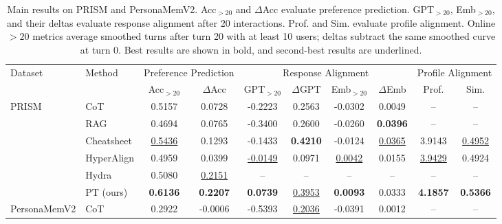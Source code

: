 \begin{table}[t]
\centering
\small
\setlength{\tabcolsep}{3.2pt}
\renewcommand{\arraystretch}{1.12}
\caption{
Main results on PRISM and PersonaMemV2.
Acc$_{>20}$ and $\Delta$Acc evaluate preference prediction.
GPT$_{>20}$, Emb$_{>20}$, and their deltas evaluate response alignment after 20 interactions.
Prof. and Sim. evaluate profile alignment.
Online $>20$ metrics average smoothed turns after turn 20 with at least 10 users; deltas subtract the same smoothed curve at turn 0.
Best results are shown in bold, and second-best results are underlined.
}
\label{tab:main_results}
\begin{tabular*}{\textwidth}{@{\extracolsep{\fill}}llcccccccc@{}}
\toprule
\multirow{2}{*}{Dataset} 
& \multirow{2}{*}{Method}
& \multicolumn{2}{c}{Preference Prediction}
& \multicolumn{4}{c}{Response Alignment}
& \multicolumn{2}{c}{Profile Alignment} \\
\cmidrule(lr){3-4} \cmidrule(lr){5-8} \cmidrule(lr){9-10}
& 
& Acc$_{>20}$ 
& $\Delta$Acc 
& GPT$_{>20}$ 
& $\Delta$GPT 
& Emb$_{>20}$ 
& $\Delta$Emb 
& Prof. 
& Sim. \\
\midrule

\multirow{6}{*}{PRISM}
& CoT
& 0.5157
& 0.0728
& -0.2223
& 0.2563
& -0.0302
& 0.0049
& --
& -- \\

& RAG
& 0.4694
& 0.0765
& -0.3400
& 0.2600
& -0.0260
& \textbf{0.0396}
& --
& -- \\

& Cheatsheet
& \underline{0.5436}
& 0.1293
& -0.1433
& \textbf{0.4210}
& -0.0124
& \underline{0.0365}
& 3.9143
& \underline{0.4952} \\

& HyperAlign
& 0.4959
& 0.0399
& \underline{-0.0149}
& 0.0971
& \underline{0.0042}
& 0.0155
& \underline{3.9429}
& 0.4924 \\

& Hydra
& 0.5080
& \underline{0.2151}
& --
& --
& --
& --
& --
& -- \\

\cmidrule(lr){2-10}
& PT (ours)
& \textbf{0.6136}
& \textbf{0.2207}
& \textbf{0.0739}
& \underline{0.3953}
& \textbf{0.0093}
& 0.0333
& \textbf{4.1857}
& \textbf{0.5366} \\

\midrule

\multirow{6}{*}{PersonaMemV2}
& CoT
& 0.2922
& -0.0006
& -0.5393
& \underline{0.2036}
& -0.0391
& 0.0012
& --
& -- \\


\end{tabular*}
\end{table}
